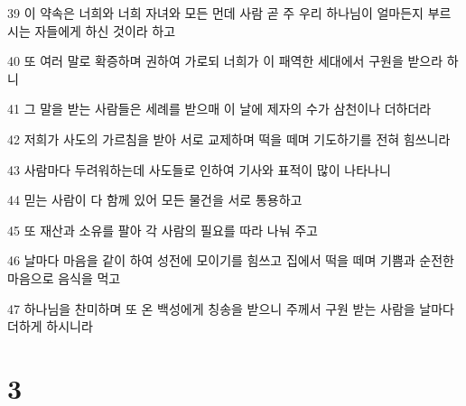 \par 39 이 약속은 너희와 너희 자녀와 모든 먼데 사람 곧 주 우리 하나님이 얼마든지 부르시는 자들에게 하신 것이라 하고
\par 40 또 여러 말로 확증하며 권하여 가로되 너희가 이 패역한 세대에서 구원을 받으라 하니
\par 41 그 말을 받는 사람들은 세례를 받으매 이 날에 제자의 수가 삼천이나 더하더라
\par 42 저희가 사도의 가르침을 받아 서로 교제하며 떡을 떼며 기도하기를 전혀 힘쓰니라
\par 43 사람마다 두려워하는데 사도들로 인하여 기사와 표적이 많이 나타나니
\par 44 믿는 사람이 다 함께 있어 모든 물건을 서로 통용하고
\par 45 또 재산과 소유를 팔아 각 사람의 필요를 따라 나눠 주고
\par 46 날마다 마음을 같이 하여 성전에 모이기를 힘쓰고 집에서 떡을 떼며 기쁨과 순전한 마음으로 음식을 먹고
\par 47 하나님을 찬미하며 또 온 백성에게 칭송을 받으니 주께서 구원 받는 사람을 날마다 더하게 하시니라

\chapter{3}


